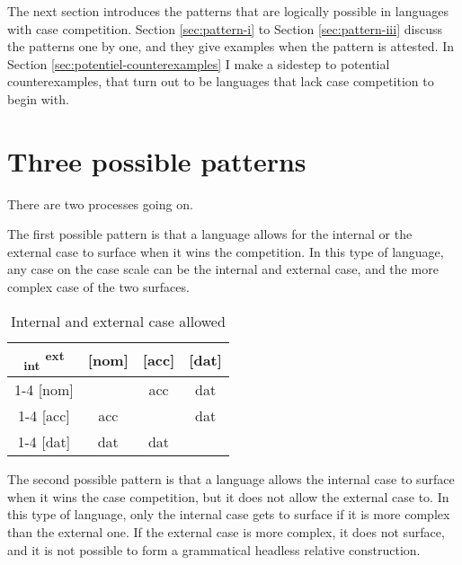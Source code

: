 The next section introduces the patterns that are logically possible in languages with case competition. Section \ref{sec:pattern-i} to Section \ref{sec:pattern-iii} discuss the patterns one by one, and they give examples when the pattern is attested. In Section \ref{sec:potentiel-counterexamples} I make a sidestep to potential counterexamples, that turn out to be languages that lack case competition to begin with.


\section{Three possible patterns}

There are two processes going on.

The first possible pattern is that a language allows for the internal or the external case to surface when it wins the competition. In this type of language, any case on the case scale can be the internal and external case, and the more complex case of the two surfaces.

\begin{table}[ht]
  \center
  \caption{Internal and external case allowed}
  \begin{tabular}{c|c|c|c}
    \toprule
        \textsubscript{\ac{int}} \textsuperscript{\ac{ext}}
          & [\ac{nom}]
          & [\ac{acc}]
          & [\ac{dat}]
          \\ \cmidrule{1-4}
      [\ac{nom}]
          &
          & \ac{acc}
          & \ac{dat}
          \\ \cmidrule{1-4}
      [\ac{acc}]
          & \ac{acc}
          &
          & \ac{dat}
          \\ \cmidrule{1-4}
      [\ac{dat}]
          & \ac{dat}
          & \ac{dat}
          &
          \\
    \bottomrule
  \end{tabular}
    \label{tbl:case-competition-int-ext}
\end{table}

The second possible pattern is that a language allows the internal case to surface when it wins the case competition, but it does not allow the external case to. In this type of language, only the internal case gets to surface if it is more complex than the external one. If the external case is more complex, it does not surface, and it is not possible to form a grammatical headless relative construction.

